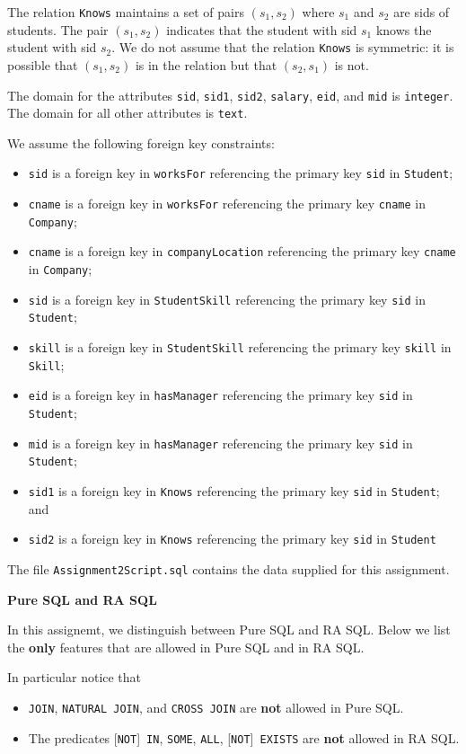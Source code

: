 \documentclass[11pt]{article}
\begin{document}
The relation {\tt Knows} maintains a set of pairs $(s_1,s_2)$ where $s_1$ 
and $s_2$ are sids of students.   The pair $(s_1,s_2)$ indicates that the student with
sid $s_1$ knows the student with sid $s_2$.
We do not assume that the relation {\tt Knows} is
symmetric: it is possible that $(s_1,s_2)$ is in the relation but that
$(s_2,s_1)$ is not.

The domain for the attributes {\tt sid}, {\tt sid1}, {\tt sid2}, {\tt salary}, {\tt eid}, and {\tt mid} is {\tt integer}.   The domain for all other attributes is {\tt text}.

We assume the following foreign key constraints:
\begin{itemize}
\item {\tt sid} is a foreign key in {\tt worksFor} referencing the primary key {\tt sid} in {\tt Student};
\item {\tt cname} is a foreign key in {\tt worksFor} referencing the primary key {\tt cname} in {\tt Company};
\item {\tt cname} is a foreign key in {\tt companyLocation} referencing the primary key {\tt cname} in {\tt Company};
\item {\tt sid} is a foreign key in {\tt StudentSkill} referencing the primary key {\tt sid} in {\tt Student};
\item {\tt skill} is a foreign key in {\tt StudentSkill} referencing the primary key {\tt skill} in {\tt Skill};
\item {\tt eid} is a foreign key in {\tt hasManager} referencing the primary key {\tt sid} in {\tt Student}; 
\item {\tt mid} is a foreign key in {\tt hasManager} referencing the primary key {\tt sid} in {\tt Student};
\item {\tt sid1} is a foreign key in {\tt Knows} referencing the primary key {\tt sid} in {\tt Student}; and
\item {\tt sid2} is a foreign key in {\tt Knows} referencing the primary key {\tt sid} in {\tt Student}
\end{itemize}

The file {\tt Assignment2Script.sql} contains the data supplied for this assignment.
\newpage

\noindent
\large{\bf Pure SQL and RA SQL}

\bigskip
In this assignemt, we distinguish between Pure SQL and RA SQL.
Below we list the {\bf only} features that are allowed in Pure SQL and in RA SQL. 

In particular notice that 
\begin{itemize}
\item {\tt JOIN}, {\tt NATURAL~JOIN}, and {\tt CROSS~JOIN} are {\bf not} allowed in Pure SQL.
\item The predicates  [{\tt NOT}]~{\tt IN}, {\tt SOME}, {\tt ALL}, [{\tt NOT}]~{\tt EXISTS} are {\bf not} allowed in RA SQL.
\end{itemize}
\end{document}
